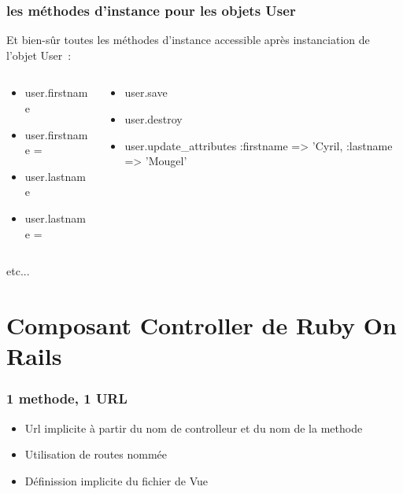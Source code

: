 \documentclass{beamer}
\begin{document}
\begin{frame}
    \frametitle{les méthodes d'instance pour les objets User}
    Et bien-sûr toutes les méthodes d'instance accessible après instanciation
    de l'objet User~:
    \scriptsize{}
    \begin{columns}
        \begin{column}[l]{3cm}
            \begin{itemize}
                \item user.firstname
                \item user.firstname =
                \item user.lastname
                \item user.lastname =
            \end{itemize}
        \end{column}

        \begin{column}[r]{6cm}
            \begin{itemize}
                \item user.save
                \item user.destroy
                \item user.update\_attributes :firstname => 'Cyril, 
                                                :lastname => 'Mougel'
            \end{itemize}
        \end{column}
    \end{columns}
    \normalsize{}
    etc...
\end{frame}


\section{Composant Controller de Ruby On Rails}

\begin{frame}
    \frametitle{1 methode, 1 URL}
    \begin{itemize}
        \item Url implicite à partir du nom de controlleur et du nom de la
        methode
        \item Utilisation de routes nommée
        \item Définission implicite du fichier de Vue
    \end{itemize}
\end{frame}
\end{document}
